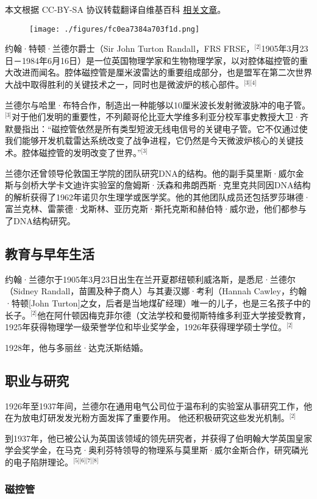 
本文根据 CC-BY-SA 协议转载翻译自维基百科 \href{https://en.wikipedia.org/wiki/John_Randall_(physicist)}{相关文章}。

\begin{figure}[ht]
\centering
\texttt{[image: ./figures/fc0ea7384a703f1d.png]}
\caption{} \label{fig_YHldr_1}
\end{figure}
约翰·特顿·兰德尔爵士（Sir John Turton Randall，FRS FRSE，\(^\text{[2]}\)1905年3月23日－1984年6月16日）是一位英国物理学家和生物物理学家，以对腔体磁控管的重大改进而闻名。腔体磁控管是厘米波雷达的重要组成部分，也是盟军在第二次世界大战中取得胜利的关键技术之一，同时也是微波炉的核心部件。\(^\text{[3][4]}\)

兰德尔与哈里·布特合作，制造出一种能够以10厘米波长发射微波脉冲的电子管。\(^\text{[3]}\)对于他们发明的重要性，不列颠哥伦比亚大学维多利亚分校军事史教授大卫·齐默曼指出：“磁控管依然是所有类型短波无线电信号的关键电子管。它不仅通过使我们能够开发机载雷达系统改变了战争进程，它仍然是今天微波炉核心的关键技术。腔体磁控管的发明改变了世界。”\(^\text{[3]}\)

兰德尔还曾领导伦敦国王学院的团队研究DNA的结构。他的副手莫里斯·威尔金斯与剑桥大学卡文迪许实验室的詹姆斯·沃森和弗朗西斯·克里克共同因DNA结构的解析获得了1962年诺贝尔生理学或医学奖。他的其他团队成员还包括罗莎琳德·富兰克林、雷蒙德·戈斯林、亚历克斯·斯托克斯和赫伯特·威尔逊，他们都参与了DNA结构研究。
\subsection{教育与早年生活}
约翰·兰德尔于1905年3月23日出生在兰开夏郡纽顿利威洛斯，是悉尼·兰德尔（Sidney Randall，苗圃及种子商人）与其妻汉娜·考利（Hannah Cawley，约翰·特顿[John Turton]之女，后者是当地煤矿经理）唯一的儿子，也是三名孩子中的长子。\(^\text{[2]}\)他在阿什顿因梅克菲尔德（文法学校和曼彻斯特维多利亚大学接受教育，1925年获得物理学一级荣誉学位和毕业奖学金，1926年获得理学硕士学位。\(^\text{[2]}\)

1928年，他与多丽丝·达克沃斯结婚。
\subsection{职业与研究}
1926年至1937年间，兰德尔在通用电气公司位于温布利的实验室从事研究工作，他在为放电灯研发发光粉方面发挥了重要作用。 他还积极研究这些发光机制。\(^\text{[2]}\)

到1937年，他已被公认为英国该领域的领先研究者，并获得了伯明翰大学英国皇家学会奖学金，在马克·奥利芬特领导的物理系与莫里斯·威尔金斯合作，研究磷光的电子陷阱理论。\(^\text{[5][6][7][8]}\)
\subsubsection{磁控管}
